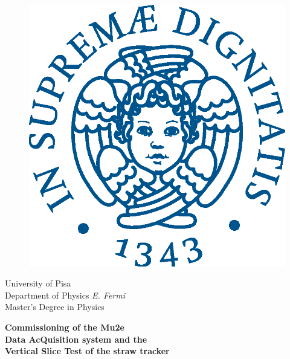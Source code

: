 \begin{titlepage}
\begin{figure}[!htb]
    \centering
    \includegraphics[keepaspectratio=true,scale=0.5]{figures/eps/cherubinFrontespizio.eps}
\end{figure}

\begin{center}
    \LARGE{University of Pisa}
    \vspace{5mm}
    \\ \large{Department of Physics \textit{E. Fermi}}
    \vspace{5mm}
    \\ \LARGE{Master's Degree in Physics}
\end{center}

\vspace{15mm}
\begin{center}
    {\Large{\bf Commissioning of the Mu2e\\ \vspace{3mm} Data AcQuisition system and the\\ \vspace{5mm} Vertical Slice Test of the straw tracker}}
    
    

\end{center}
\end{titlepage}
